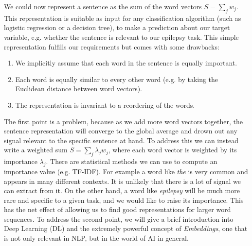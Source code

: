 We could now represent a sentence as the sum of the word vectors $S = \sum_j w_j$. This representation is suitable as input for any classification algorithm (such as logistic regression or a decision tree), to make a prediction about our target variable, e.g. whether the sentence is relevant to our epilepsy task.
This simple representation fulfills our requirements but comes with some drawbacks:
\begin{enumerate}
    \item We implicitly assume that each word in the sentence is equally important.
    \item Each word is equally similar to every other word (e.g. by taking the Euclidean distance between word vectors).
    \item The representation is invariant to a reordering of the words.
\end{enumerate}
The first point is a problem, because as we add more word vectors together, the sentence representation will converge to the global average and drown out any signal relevant to the specific sentence at hand.
To address this we can instead write a weighted sum $S = \sum_j \lambda_j w_j$, where each word vector is weighted by its importance $\lambda_j$. There are statistical methods we can use to compute an importance value (e.g. TF-IDF).
For example a word like \textit{the} is very common and appears in many different contexts.
It is unlikely that there is a lot of signal we can extract from it.
On the other hand, a word like \textit{epilepsy} will be much more rare and specific to a given task, and we would like to raise its importance.
This has the net effect of allowing us to find good representations for larger word sequences.
To address the second point, we will give a brief introduction into Deep Learning (DL) and the extremely powerful concept of \textit{Embeddings}, one that is not only relevant in NLP, but in the world of AI in general.
